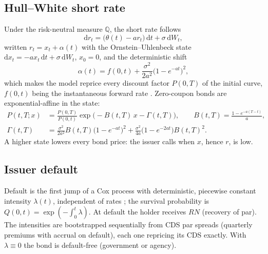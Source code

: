 \documentclass[11pt,a4paper]{article}
\newcommand{\Q}{\mathbb{Q}}
\newcommand{\dd}{\mathrm{d}}
\begin{document}
\subsection{Hull--White short rate}
Under the risk-neutral measure $\Q$, the short rate follows \cite{hull1990}
\begin{equation}
\dd r_t = \big(\theta(t) - a r_t\big)\,\dd t + \sigma\,\dd W_t,
\end{equation}
written $r_t = x_t + \alpha(t)$ with the Ornstein--Uhlenbeck state $\dd x_t = -a x_t\,\dd t + \sigma\,\dd W_t$,
$x_0 = 0$, and the deterministic shift
\begin{equation}
\alpha(t) = f(0,t) + \frac{\sigma^2}{2a^2}\big(1 - e^{-at}\big)^2,
\end{equation}
which makes the model reprice every discount factor $P(0,T)$ of the initial curve, $f(0,t)$ being the
instantaneous forward rate \cite{brigo2006}. Zero-coupon bonds are exponential-affine in the state:
\begin{equation}\label{eq:zcb}
\begin{aligned}
P(t,T;x) &= \frac{P(0,T)}{P(0,t)}\exp\!\big(-B(t,T)\,x - \Gamma(t,T)\big), \qquad
B(t,T) = \frac{1 - e^{-a(T-t)}}{a},\\
\Gamma(t,T) &= \frac{\sigma^2}{2a^2}B(t,T)\big(1-e^{-at}\big)^2 + \frac{\sigma^2}{4a}\big(1-e^{-2at}\big)B(t,T)^2.
\end{aligned}
\end{equation}
A higher state lowers every bond price: the issuer calls when $x$, hence $r$, is low.

\subsection{Issuer default}
Default is the first jump of a Cox process with deterministic, piecewise constant intensity $\lambda(t)$,
independent of rates \cite{lando1998,duffie1999}; the survival probability is
$Q(0,t) = \exp(-\int_0^t \lambda)$. At default the holder receives $RN$ (recovery of par). The intensities are
bootstrapped sequentially from CDS par spreads (quarterly premiums with accrual on default), each one repricing its
CDS exactly. With $\lambda \equiv 0$ the bond is default-free (government or agency).
\end{document}
